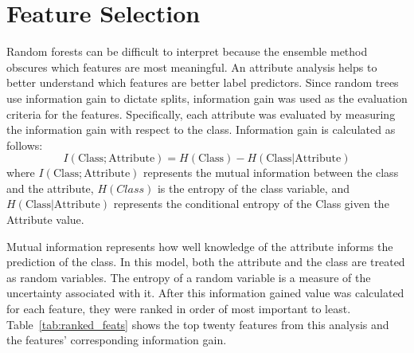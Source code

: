 \documentclass[12pt]{report}
\begin{document}
\section{Feature Selection}
Random forests can be difficult to interpret because the ensemble method obscures which features are most meaningful.
An attribute analysis helps to better understand which features are better label predictors.
Since random trees use information gain to dictate splits, information gain was used as the evaluation criteria for the features.
Specifically, each attribute was evaluated by measuring the information gain with respect to the class.
Information gain is calculated as follows:
\begin{equation}
I(\text{Class}; \text{Attribute}) = H(\text{Class}) - H(\text{Class} | \text{Attribute})
\end{equation} \label{eq:info_gained}
where $I(\text{Class}; \text{Attribute})$ represents the mutual information between the class and the attribute, $H(Class)$ is the entropy of the class variable, and  $H(\text{Class} | \text{Attribute})$ represents the conditional entropy of the Class given the Attribute value.  

Mutual information represents how well knowledge of the attribute informs the prediction of the class.
In this model, both the attribute and the class are treated as random variables.
The entropy of a random variable is a measure of the uncertainty associated with it.
After this information gained value was calculated for each feature, they were ranked in order of most important to least.
Table~\ref{tab:ranked_feats} shows the top twenty features from this analysis and the features' corresponding information gain.
\end{document}
